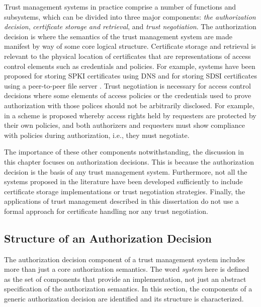 Trust management systems in practice comprise a number of functions and subsystems, which can be
divided into three major components: \emph{the authorization decision}, \emph{certificate 
storage and retrieval}, and \emph{trust negotiation}. The authorization decision is where the
semantics of the trust management system are made manifest by way of some core logical
structure. Certificate storage and retrieval is relevant to the physical location of
certificates that are representations of access control elements such as credentials and
policies. For example, systems have been proposed for storing SPKI certificates using DNS
\cite{nikander98storing} and for storing SDSI certificates using a peer-to-peer file server
\cite{ajmani02conchord}. Trust negotiation
\cite{Winsborough:ATN,Yu:PECSATNI,Seamons:LDACPATN,Yu:ISATN,Winsborough:TPATN,Winsborough:SATN}
is necessary for access control decisions where some elements of access policies or the
credentials used to prove authorization with those polices should not be arbitrarily disclosed.
For example, in \cite{Winsborough:ATN} a scheme is proposed whereby access rights held by
requesters are protected by their own policies, and both authorizers and requesters must show
compliance with policies during authorization, i.e., they must negotiate.

The importance of these other components notwithstanding, the discussion in this chapter focuses
on authorization decisions. This is because the authorization decision is the basis of any trust
management system. Furthermore, not all the systems proposed in the literature have been
developed sufficiently to include certificate storage implementations or trust negotiation
strategies. Finally, the applications of trust management described in this dissertation do not
use a formal approach for certificate handling nor any trust negotiation.

\subsection{Structure of an Authorization Decision}
\label{section-components-structure}

The authorization decision component of a trust management system includes more than just a core
authorization semantics. The word \emph{system} here is defined as the set of components that
provide an implementation, not just an abstract specification of the authorization semantics. In
this section, the components of a generic authorization decision are identified and its
structure is characterized.

